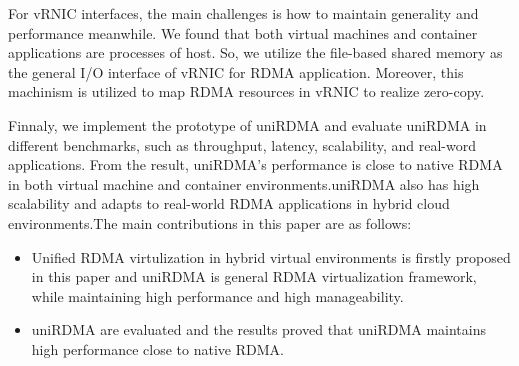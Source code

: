 For vRNIC interfaces, the main challenges is how to maintain generality and performance meanwhile. We found that both virtual machines and container applications are processes of host. So, we utilize the file-based shared memory as the general I/O interface of vRNIC for RDMA application. Moreover, this machinism is utilized to map RDMA resources in vRNIC to realize zero-copy. 

Finnaly, we implement the prototype of uniRDMA and evaluate uniRDMA in different benchmarks, such as throughput, latency, scalability, and real-word applications. From the result, uniRDMA's performance is close to native RDMA in both virtual machine and container environments.uniRDMA also has high scalability and adapts to real-world RDMA applications in hybrid cloud environments.The main contributions in this paper are as follows:

\begin{itemize}
\item Unified RDMA virtulization in hybrid virtual environments is firstly proposed in this paper and uniRDMA is general RDMA virtualization framework,  while maintaining high performance and high manageability.

\item uniRDMA are evaluated and the results proved that uniRDMA maintains high performance close to native RDMA.
\end{itemize}
